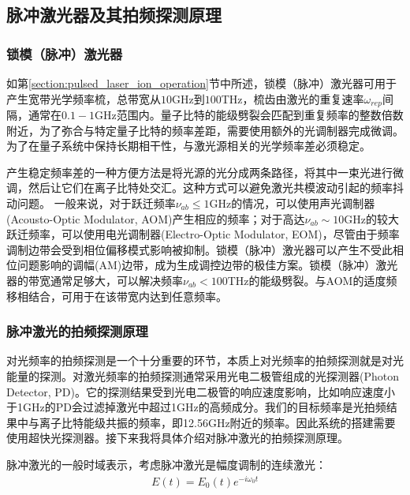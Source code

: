 \subsection[脉冲激光器及其拍频探测原理]{脉冲激光器及其拍频探测原理}
\subsubsection[锁模（脉冲）激光器]{锁模（脉冲）激光器}
如第\ref{section:pulsed_laser_ion_operation}节中所述，锁模（脉冲）激光器可用于产生宽带光学频率梳，总带宽从$10$GHz到$100 $THz，梳齿由激光的重复速率$\omega_{rep}$间隔，通常在$0.1-1 $GHz范围内。量子比特的能级劈裂会匹配到重复频率的整数倍数附近，为了弥合与特定量子比特的频率差距，需要使用额外的光调制器完成微调\cite[]{Hayes_Matsukevich_Maunz_Hucul_Quraishi_Olmschenk_Campbell_Mizrahi_Senko_Monroe_2010}。为了在量子系统中保持长期相干性，与激光源相关的光学频率差必须稳定\cite[]{Stick_Hensinger_Olmschenk_Madsen_Schwab_Monroe_2006}。

产生稳定频率差的一种方便方法是将光源的光分成两条路径，将其中一束光进行微调，然后让它们在离子比特处交汇。这种方式可以避免激光共模波动引起的频率抖动问题\cite[]{Thomas_Hemmer_Ezekiel_Leiby_Picard_Willis_2002}。
一般来说，对于跃迁频率$\nu_{ab}\leq 1$GHz的情况，可以使用声光调制器(Acousto-Optic Modulator, AOM)产生相应的频率；对于高达$\nu_{ab} \sim 10 $GHz的较大跃迁频率，可以使用电光调制器(Electro-Optic Modulator, EOM)，尽管由于频率调制边带会受到相位偏移模式影响被抑制\cite[]{Lee_Blinov_Brickman_Deslauriers_Madsen_Miller_Moehring_Stick_Monroe_2003}。锁模（脉冲）激光器可以产生不受此相位问题影响的调幅(AM)边带，成为生成调控边带的极佳方案。锁模（脉冲）激光器的带宽通常足够大，可以解决频率$\nu_{ab} < 100 $THz的能级劈裂。与AOM的适度频移相结合，可用于在该带宽内达到任意频率。

\subsubsection[脉冲激光的拍频探测原理]{脉冲激光的拍频探测原理}
对光频率的拍频探测是一个十分重要的环节，本质上对光频率的拍频探测就是对光能量的探测。对激光频率的拍频探测通常采用光电二极管组成的光探测器(Photon Detector, PD)。它的探测结果受到光电二极管的响应速度影响，比如响应速度小于1GHz的PD会过滤掉激光中超过1GHz的高频成分。我们的目标频率是光拍频结果中与离子比特能级共振的频率，即12.56GHz附近的频率。因此系统的搭建需要使用超快光探测器。接下来我将具体介绍对脉冲激光的拍频探测原理。

脉冲激光的一般时域表示，考虑脉冲激光是幅度调制的连续激光：
\begin{align}
    E(t)=E_0 (t) e^{-i\omega_0 t}
\end{align}

